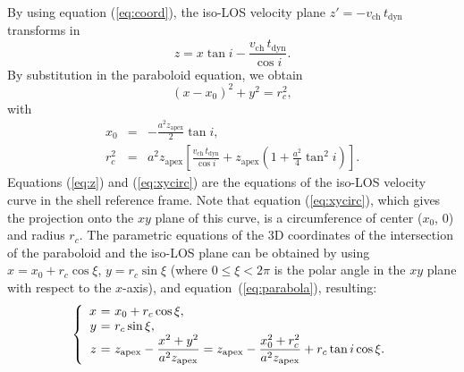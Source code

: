 \documentclass[12pt]{mythesis}
\begin{document}
By using equation (\ref{eq:coord}), the iso-LOS velocity plane $z'= -v_\mathrm{ch}\,t_\mathrm{dyn}$ transforms in
\begin{equation}
z= x \tan i -\frac{v_\mathrm{ch}\,t_\mathrm{dyn}}{\cos i}.\label{eq:z}
\end{equation}
By substitution in the paraboloid equation, we obtain
\begin{equation}
(x-x_0)^2+y^2= r_c^2, \label{eq:xycirc}
\end{equation}
with
\begin{eqnarray}
	x_0 &=& -\frac{a^2 z_\mathrm{apex}}{2}\tan i, \label{eq:x0}\\
	r_c^2 &=& a^2 z_\mathrm{apex}\left[\frac{v_\mathrm{ch}\,t_\mathrm{dyn}}{\cos i}+z_\mathrm{apex}\left(1+\frac{a^2}{4}\tan^2 i\right)\right].\label{eq:r}
\end{eqnarray}
Equations (\ref{eq:z}) and (\ref{eq:xycirc}) are the equations of the iso-LOS velocity curve in the shell reference frame. Note that equation (\ref{eq:xycirc}), which gives the projection onto the $xy$ plane of this curve, is a circumference of center ($x_0$, 0) and radius $r_c$.
The parametric equations of the 3D coordinates of the intersection of the paraboloid and the iso-LOS plane can be obtained by using $x=x_0+r_c\cos\xi$, $y=r_c\sin\xi$ (where $0\le \xi< 2\pi$ is the polar angle in the $xy$ plane with respect to the $x$-axis), and equation~(\ref{eq:parabola}), resulting:  
\begin{equation}\label{eq:xyproj}
\left\{\begin{array}{r@{\ }c@{\ }l}
x &=& x_0+r_c\cos \xi, \\
y &=&     r_c\sin \xi, \\
z &=& z_\mathrm{apex} -\displaystyle\frac{x^2+y^2}{a^2 z_\mathrm{apex}}=
z_\mathrm{apex}-\displaystyle\frac{x_0^2+r_c^2}{a^2 z_\mathrm{apex}}+r_c\tan i \cos \xi.
\end{array}\right.
\end{equation}
\end{document}
